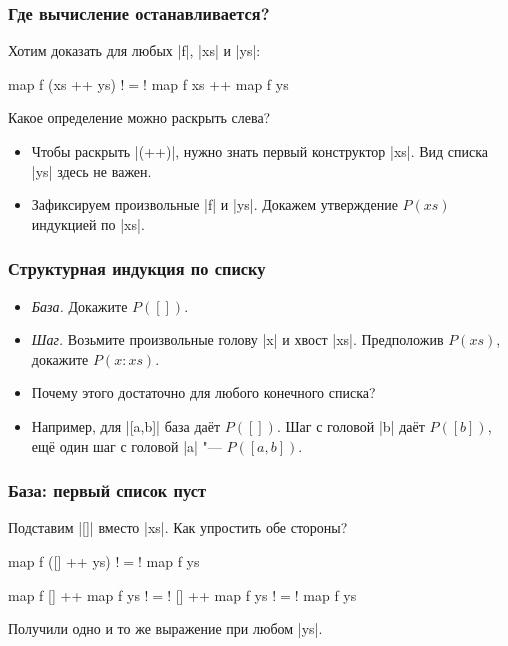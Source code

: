 \documentclass[11pt]{beamer}
\begin{document}
\begin{frame}[fragile]
  \frametitle{Где вычисление останавливается?}
  Хотим доказать для любых \haskinline|f|, \haskinline|xs| и \haskinline|ys|:
  \begin{haskell}
    map f (xs ++ ys) !$=$! map f xs ++ map f ys
  \end{haskell}
  Какое определение можно раскрыть слева? \pause
  \begin{itemize}
    \item Чтобы раскрыть \haskinline|(++)|, нужно знать первый конструктор \haskinline|xs|. Вид списка \haskinline|ys| здесь не важен.
    \item Зафиксируем произвольные \haskinline|f| и \haskinline|ys|. Докажем утверждение $P(\mathit{xs})$ индукцией по \haskinline|xs|.
  \end{itemize}
\end{frame}

\begin{frame}[fragile]
  \frametitle{Структурная индукция по списку}
  \begin{itemize}
    \item \emph{База.} Докажите $P([])$.
    \item \emph{Шаг.} Возьмите произвольные голову \haskinline|x| и хвост \haskinline|xs|. Предположив $P(\mathit{xs})$, докажите $P(x : \mathit{xs})$.
    \item Почему этого достаточно для любого конечного списка? \pause
    \item Например, для \haskinline|[a,b]| база даёт $P([])$. Шаг с головой \haskinline|b| даёт $P([b])$, ещё один шаг с головой \haskinline|a| "--- $P([a,b])$.
  \end{itemize}
\end{frame}

\begin{frame}[fragile]
  \frametitle{База: первый список пуст}
  Подставим \haskinline|[]| вместо \haskinline|xs|. Как упростить обе стороны? \pause
  \begin{haskell}
      map f ([] ++ ys)
    !$=$! map f ys
  \end{haskell}
  \pause
  \begin{haskell}
      map f [] ++ map f ys
    !$=$! [] ++ map f ys
    !$=$! map f ys
  \end{haskell}
  Получили одно и то же выражение при любом \haskinline|ys|.
\end{frame}
\end{document}
